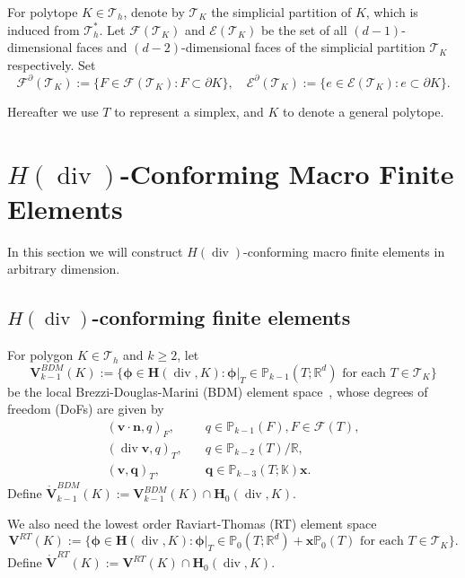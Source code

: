 \documentclass[10pt]{amsart}
\newcommand{\bs}{\boldsymbol}
\renewcommand{\div}{\operatorname{div}}
\numberwithin{equation}{section}
\begin{document}
For polytope $K\in \mathcal T_h$, denote by $\mathcal T_K$ the simplicial partition of $K$, which is induced from $\mathcal T_h^*$. Let $\mathcal{F}(\mathcal T_K)$ and $\mathcal{E}(\mathcal T_K)$ be the set of all $(d-1)$-dimensional faces and $(d-2)$-dimensional faces of the simplicial partition $\mathcal T_K$ respectively. Set 
$$
\mathcal{F}^{\partial}(\mathcal T_K):=\{F\in\mathcal{F}(\mathcal T_K): F\subset\partial K\},\quad \mathcal{E}^{\partial}(\mathcal T_K):=\{e\in\mathcal{E}(\mathcal T_K): e\subset\partial K\}.
$$

Hereafter we use $T$ to represent a simplex, and $K$ to denote a general polytope.




\section{$H(\div)$-Conforming Macro Finite Elements}\label{sec:divmacrofem}

In this section we will construct $H(\div)$-conforming macro finite elements in arbitrary dimension.
\subsection{$H(\div)$-conforming finite elements}
For polygon $K\in \mathcal T_h$ and $k\geq2$, let 
$$
\boldsymbol{V}_{k-1}^{BDM}(K):=\{\boldsymbol{\phi}\in\bs H(\div, K): \boldsymbol{\phi}|_{T}\in \mathbb P_{k-1}(T;\mathbb R^d) \textrm{ for each } T\in\mathcal T_K\}
$$ 
be the local Brezzi-Douglas-Marini (BDM) element space~\cite{BrezziDouglasMarini1986,BrezziDouglasDuranFortin1987,Nedelec:1986family}, whose degrees of freedom (DoFs) are given by \cite{ChenHuang2021divdiv}
\begin{align}
(\boldsymbol{v}\cdot\boldsymbol{n}, q)_F, & \quad q\in \mathbb P_{k-1}(F), F\in\mathcal F(T), \label{BDMdof1} \\
(\div\boldsymbol{v}, q)_T, & \quad q\in \mathbb P_{k-2}(T)/\mathbb R, \label{BDMdof2} \\
(\boldsymbol{v}, \boldsymbol{q})_T, & \quad \boldsymbol{q}\in \mathbb P_{k-3}(T;\mathbb K)\boldsymbol{x}. \label{BDMdof3}
\end{align}
Define $\mathring{\boldsymbol{V}}_{k-1}^{BDM}(K):=\boldsymbol{V}_{k-1}^{BDM}(K)\cap \boldsymbol{H}_0(\div, K)$.

We also need the lowest order Raviart-Thomas (RT) element space~\cite{BrezziDouglasMarini1986,BrezziDouglasDuranFortin1987,Nedelec:1986family}
$$
\boldsymbol{V}^{RT}(K):=\{\boldsymbol{\phi}\in\bs H(\div, K): \boldsymbol{\phi}|_{T}\in \mathbb P_{0}(T;\mathbb R^d)+\boldsymbol{x}\mathbb P_{0}(T) \textrm{ for each } T\in\mathcal T_K\}.
$$
Define $\mathring{\boldsymbol{V}}^{RT}(K):=\boldsymbol{V}^{RT}(K)\cap \boldsymbol{H}_0(\div, K)$.
\end{document}
